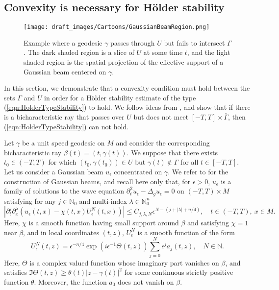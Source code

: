 \documentclass[final,leqno]{siamart1116}
\begin{document}
\subsection{Convexity is necessary for H\"older stability}

\begin{figure}[!htb]
  \label{img:GaussianBeamCartoon}
  \centering
  \texttt{[image: draft\_images/Cartoons/GaussianBeamRegion.png]}
  \caption{Example where a geodesic $\gamma$ passes through $U$ but
    fails to intersect $\Gamma$. The dark shaded region is a slice of
    $U$ at some time $t$, and the light shaded region is the spatial
    projection of the effective support of a Gaussian beam centered on
    $\gamma$.}
\end{figure}

In this section, we demonstrate that a convexity condition must hold
between the sets $\Gamma$ and $U$ in order for a H\"{o}lder stability
estimate of the type (\ref{eqn:HolderTypeStability}) to
hold. 
We follow ideas from \cite{Ralston1982}, and show  
that if there is a bicharacteristic ray
that passes over $U$ but does not meet $[-T,T]\times \overline{\Gamma}$,
then (\ref{eqn:HolderTypeStability}) can not hold. 

Let $\gamma$ be a unit
speed geodesic on $M$ and consider the corresponding bicharacteristic ray $\beta(t) = (t,\gamma(t))$. We suppose that there exists $t_0 \in
(-T,T)$ for which $(t_0,\gamma(t_0)) \in U$ but $\gamma(t) \not \in
\overline{\Gamma}$ for all $t \in [-T,T]$.
Let us consider a Gaussian beam $u_\epsilon$ concentrated on $\gamma$.
We refer to
\cite{Katchalov2001,Ralston1982} for the construction of Gaussian beams,
and recall here only that, for $\epsilon > 0$, $u_\epsilon$ is a family of solutions to the wave equation ${\partial}_t^2 u_\epsilon -  \Delta_g u_\epsilon = 0$ on $(-T,T) \times M$ satisfying 
for any $j \in
\mathbb{N}_0$ and multi-index $\lambda \in \mathbb{N}_0^n$
\begin{equation*}
  |{\partial}_t^j {\partial}_x^\lambda (u_\epsilon(t,x) - \chi(t,x) U_\epsilon^N(t,x))| \leq C_{j,\lambda,N} \epsilon^{N - (j + |\lambda| + n/4)},
  \quad t \in (-T,T),\ x \in M.
\end{equation*}
Here, $\chi$ is a smooth function having small support around $\beta$ and satisfying $\chi = 1$ near $\beta$,
and in local coordinates $(t,z)$, $U_\epsilon^N$ is a smooth function of the form
$$
U_\epsilon^N(t,z) = \epsilon^{-n/4} \exp\left(i\epsilon^{-1} \Theta(t,z)\right) \sum_{j=0}^N \epsilon^j a_j(t,z), \quad N \in {\mathbb{N}}.
$$
Here, $\Theta$ is a complex valued function whose imaginary part vanishes on $\beta$, and satisfies $\Im \Theta(t,z) \ge \theta(t) |z-\gamma(t)|^2$ for some continuous strictly positive function $\theta$. Moreover, the function $a_0$ does not vanish on $\beta$.
\end{document}
